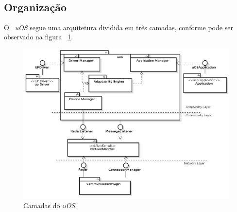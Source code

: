 ~\subsection{Organização}
\label{sec:organizacao}

	O ~\textit{uOS} segue uma arquitetura dividida em três camadas, conforme pode ser observado na
	figura ~\ref{fig:arquiteturauOS}.
	
	\begin{figure}[htb]
		\begin{center}
			\includegraphics[scale=0.5]{figuras/cap3/uoscamadas.jpg}
		\end{center}
		\caption{Camadas do \textit{uOS}.}
		\label{fig:arquiteturauOS}
	\end{figure}
	
